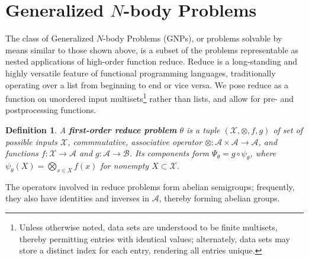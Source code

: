 \documentclass{article}
\newtheorem{definition} {Definition}
\newcommand{\comp}{\mathbin{\circ}}
\begin{document}
%  
%  
%  
%  

\section{Generalized $N$-body Problems}

The class of Generalized $N$-body Problems (GNPs), or problems
solvable by means similar to those shown above, is a subset of the
problems representable as nested applications of high-order function
reduce.  Reduce is a long-standing and highly versatile feature of
functional programming languages, traditionally operating over a list
from beginning to end or vice versa.  We pose reduce as a function on
unordered input multisets\footnote{Unless otherwise noted, data sets
are understood to be finite multisets, thereby permitting entries with
identical values; alternately, data sets may store a distinct index
for each entry, rendering all entries unique.} rather than lists, and
allow for pre- and postprocessing functions.
\begin{definition}
  A {\bf first-order reduce problem} $\theta$ is a tuple
  $(\mathcal{X},\otimes,f,g)$ of set of possible inputs $\mathcal{X}$,
  commmutative, associative operator $\otimes \colon \mathcal{A}
  \times \mathcal{A} \to \mathcal{A}$, and functions $f \colon
  \mathcal{X} \to \mathcal{A}$ and $g \colon \mathcal{A} \to
  \mathcal{B}$.  Its components form $\Psi_{\theta} = g \comp
  \psi_{\theta}$, where $\psi_{\theta}(X) = \bigotimes_{x \in X} f(x)$
  for nonempty $X \subset \mathcal{X}$.
\end{definition}
\noindent The operators involved in reduce problems form abelian
semigroups; frequently, they also have identities and inverses in
$\mathcal{A}$, thereby forming abelian groups.
\end{document}
